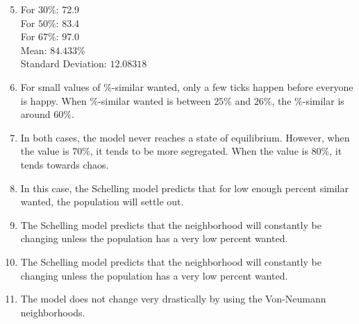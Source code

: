 \documentclass{hw}
\begin{document}

\begin{enumerate}
\setcounter{enumi}{4}
\item
For $30\%$: 72.9\\
For $50\%$: 83.4\\
For $67\%$: 97.0\\
Mean: $84.433\%$\\
Standard Deviation: $12.08318$

\setcounter{enumi}{7}
\item For small values of $\%$-similar wanted, only a few ticks happen before everyone is happy. When
$\%$-similar wanted is between $25\%$ and $26\%$, the $\%$-similar is around $60\%$.

\item In both cases, the model never reaches a state of equilibrium. However, when the value is $70\%$,
it tends to be more segregated. When the value is $80\%$, it tends towards chaos.

\setcounter{enumi}{13}
\item In this case, the Schelling model predicts that for low enough percent similar wanted, the
population
will settle out.

\item The Schelling model predicts that the neighborhood will constantly be changing unless the population
has a very low percent wanted.

\item The Schelling model predicts that the neighborhood will constantly be changing unless the population
has a very low percent wanted.

\setcounter{enumi}{17}
\item The model does not change very drastically by using the Von-Neumann neighborhoods.
\end{enumerate}
\end{document}

